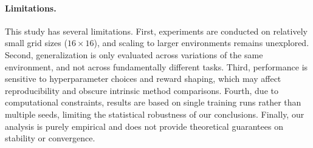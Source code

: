 \documentclass[runningheads]{llncs}
\begin{document}
\paragraph{Limitations.}
This study has several limitations. First, experiments are conducted on relatively small grid sizes ($16 \times 16$), and scaling to larger environments remains unexplored. Second, generalization is only evaluated across variations of the same environment, and not across fundamentally different tasks. Third, performance is sensitive to hyperparameter choices and reward shaping, which may affect reproducibility and obscure intrinsic method comparisons. Fourth, due to computational constraints, results are based on single training runs rather than multiple seeds, limiting the statistical robustness of our conclusions. Finally, our analysis is purely empirical and does not provide theoretical guarantees on stability or convergence.



\end{document}
